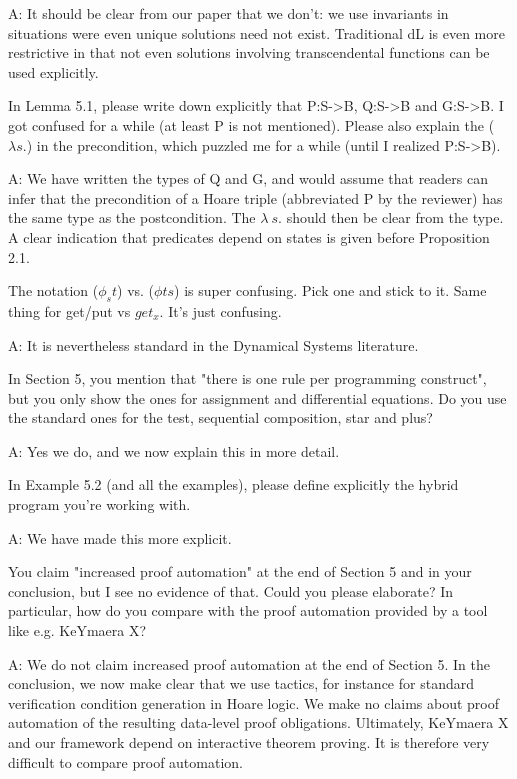 \documentclass[envcountsame,envcountsect]{llncs}
\begin{document}
A: It should be clear from our paper that we don't: we use invariants in situations were even unique solutions need not exist. Traditional dL is even more restrictive in that not even solutions involving transcendental functions can be used explicitly.

In Lemma 5.1, please write down explicitly that P:S->B, Q:S->B and G:S->B. I got confused for a while (at least P is not mentioned). Please also explain the ($\lambda s.$) in the precondition, which puzzled me for a while (until I realized P:S->B).

A: We have written the types of Q and G, and would assume that readers can infer that the precondition of a Hoare triple (abbreviated P by the reviewer) has the same type as the postcondition. The $\lambda\ s.$ should then be clear from the type. A clear indication that predicates depend on states is given before Proposition 2.1. 

The notation ($\phi_s t$) vs. ($\phi t s$) is super confusing. Pick one and stick to it. Same thing for get/put vs $get_x$. It's just confusing.

A: It is nevertheless standard in the Dynamical Systems literature.

In Section 5, you mention that "there is one rule per programming construct", but you only show the ones for assignment and differential equations. Do you use the standard ones for the test, sequential composition, star and plus?

A: Yes we do, and we now explain this in more detail.

In Example 5.2 (and all the examples), please define explicitly the hybrid program you're working with.

A: We have made this more explicit.

You claim "increased proof automation" at the end of Section 5 and in your conclusion, but I see no evidence of that. Could you please elaborate? In particular, how do you compare with the proof automation provided by a tool like e.g. KeYmaera X?

A: We do not claim increased proof automation at the end of Section 5. In the conclusion, we now make clear that we use tactics, for instance for standard verification condition generation in Hoare logic. We make no claims about proof automation of the resulting data-level proof obligations. Ultimately, KeYmaera X and our framework depend on interactive theorem proving. It is therefore very difficult to compare proof automation.
\end{document}
